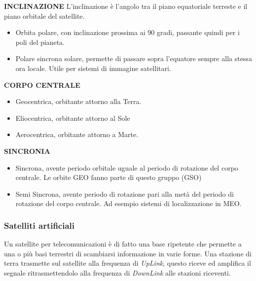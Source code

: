 \documentclass[a4paper]{article}
\begin{document}
			{\large \bf INCLINAZIONE}	
			L'inclinazione è l'angolo tra il piano equatoriale terreste e il piano orbitale del satellite.
			\begin{itemize}
				\item Orbita polare, con inclinazione prossima ai 90 gradi, passante quindi per i poli del pianeta.
				\item Polare sincrona solare, permette di passare sopra l'equatore sempre alla stessa ora locale. Utile per sistemi di immagine satellitari.
			\end{itemize}
			
			{\large \bf CORPO CENTRALE}	
			\begin{itemize}
				\item Geocentrica, orbitante attorno alla Terra.
				\item Eliocentrica, orbitante attorno al Sole
				\item Aerocentrica, orbitante attorno a Marte.
			\end{itemize}
		
		
			{\large \bf SINCRONIA}	
			\begin{itemize}
				\item Sincrona, avente periodo orbitale uguale al periodo di rotazione del corpo centrale. Le orbite GEO fanno parte di questo gruppo (GSO)
				\item Semi Sincrona, avente periodo di rotazione pari alla metà del periodo di rotazione del corpo centrale. Ad esempio sistemi di localizzazione in MEO.
			\end{itemize}
			
						
			\subsubsection{Satelliti artificiali}
			Un satellite per telecomunicazioni è di fatto una base ripetente che permette a una o più basi terrestri di scambiarsi informazione in varie forme. Una stazione di terra trasmette sul satellite alla frequenza di {\it UpLink}, questo riceve ed amplifica il segnale ritrasmettendolo alla frequenza di {\it DownLink} alle stazioni riceventi. 
			
\end{document}
